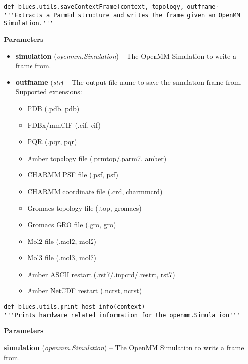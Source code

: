 \begin{description}
\begin{verbatim}
def blues.utils.saveContextFrame(context, topology, outfname)
'''Extracts a ParmEd structure and writes the frame given an OpenMM Simulation.'''
\end{verbatim}

\begin{description}
\item
    \textbf{Parameters}
\begin{itemize}
\item
  \textbf{simulation} (\emph{openmm.Simulation}) -- The OpenMM
  Simulation to write a frame from.
\item
  \textbf{outfname} (\emph{str}) -- The output file name to save the
  simulation frame from. Supported extensions:

  \begin{itemize}
  \item
    PDB (.pdb, pdb)
  \item
    PDBx/mmCIF (.cif, cif)
  \item
    PQR (.pqr, pqr)
  \item
    Amber topology file (.prmtop/.parm7, amber)
  \item
    CHARMM PSF file (.psf, psf)
  \item
    CHARMM coordinate file (.crd, charmmcrd)
  \item
    Gromacs topology file (.top, gromacs)
  \item
    Gromacs GRO file (.gro, gro)
  \item
    Mol2 file (.mol2, mol2)
  \item
    Mol3 file (.mol3, mol3)
  \item
    Amber ASCII restart (.rst7/.inpcrd/.restrt, rst7)
  \item
    Amber NetCDF restart (.ncrst, ncrst)
  \end{itemize}
\end{itemize}
\end{description}
\end{description}

\begin{description}
\begin{verbatim}
def blues.utils.print_host_info(context)
'''Prints hardware related information for the openmm.Simulation'''
\end{verbatim}


\begin{description}
\item
    \textbf{Parameters}
    \item
        \textbf{simulation} (\emph{openmm.Simulation}) -- The OpenMM Simulation to write a frame from.
\end{description}
\end{description}

